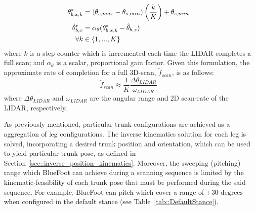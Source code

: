 				\begin{equation}
					\begin{split}
					\theta_{b,x,k}^{*} &= 
						\left(\theta_{s,max}-\theta_{s,min}\right)
							\left(\frac{k}{K}\right) + 
								\theta_{s,min} \\
					\dot{\theta}_{b,x}^{r} &=
						\alpha_{\theta}
							(\theta_{b,x,k}^{*} - \hat{\theta}_{b,x} ) \\
							\forall k &\in \{1,...,K\}
					\end{split}
				\end{equation}
			where $k$ is a step-counter which is incremented each time the LIDAR completes a full scan; and $\alpha_{\theta}$ is a scalar, proportional gain factor. Given this formulation, the approximate rate of completion for a full 3D-scan, $\tilde{f}_{scan}$, is as follows:
				\begin{equation}
					\tilde{f}_{scan}\approx\frac{1}{K}\frac{\Delta\theta_{LIDAR}}{\omega_{LIDAR}}
				\end{equation}
			where $\Delta\theta_{LIDAR}$ and $\omega_{LIDAR}$ are the angular range and 2D scan-rate of the LIDAR, respectively.

			As previously mentioned, particular trunk configurations are achieved as a aggregation of leg configurations. The inverse kinematics solution for each leg is solved, incorporating a desired trunk position and orientation, which can be used to yield particular trunk pose, as defined in Section~\ref{sec::inverse_position_kinematics}. Moreover, the sweeping (pitching) range which BlueFoot can achieve during a scanning sequence is limited by the kinematic-feasibility of each trunk pose that must be performed during the said sequence. For example, BlueFoot can pitch which cover a range of $\pm 30\text{ degrees}$ when configured in the default stance (see Table~\ref{tab::DefaultStance}).


